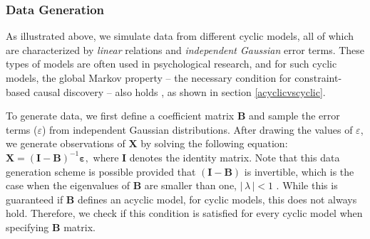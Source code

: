 \documentclass[11pt]{article}
\begin{document}
\vspace{-1cm}
\subsubsection{Data Generation}
As illustrated above, we simulate data from different cyclic models, all of which are characterized by \textit{linear} relations and \textit{independent Gaussian} error terms. These types of models are often used in psychological research, and for such cyclic models, the global Markov property -- the necessary condition for constraint-based causal discovery -- also holds , as shown in section \ref{acyclicvscyclic}.


To generate data, we first define a coefficient matrix $\mathbf{B}$ and sample the error terms ($\varepsilon$) from independent Gaussian distributions. After drawing the values of $\varepsilon$, we generate observations of $\mathbf{X}$ by solving the following equation: 
$\mathbf{X} = (\mathbf{I} - \mathbf{B})^{-1}\boldsymbol{\varepsilon},$
where $\mathbf{I}$ denotes the identity matrix. Note that this data generation scheme is possible provided that $(\mathbf{I} - \mathbf{B})$ is invertible, which is the case when the eigenvalues of $\mathbf{B}$ are smaller than one, $|\,\lambda\,| < 1$ \citep{eberhardt2010}. While this is guaranteed if $\mathbf{B}$ defines an acyclic model, for cyclic models, this does not always hold. Therefore, we check if this condition is satisfied for every cyclic model when specifying $\mathbf{B}$ matrix.

\end{document}
